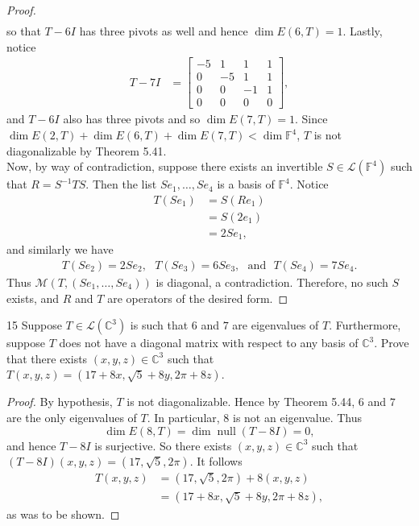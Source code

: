 \documentclass{extarticle}
\newenvironment{problem}[1]{\begin{prob*}{#1}{}}{\end{prob*}}
\newcommand{\C}{\mathbb{C}}
\newcommand{\F}{\mathbb{F}}
\newcommand{\mat}{\mathcal{M}}
\newcommand{\Hom}{\mathcal{L}}
\DeclareMathOperator{\Null}{null}
\begin{document}
\begin{proof}
\begin{align*}
\end{align*}
so that $T-6I$ has three pivots as well and hence $\dim E(6, T) = 1$.  Lastly, notice
\begin{align*}
T - 7I &= \begin{bmatrix}-5 & 1 & 1 & 1\\ 0 & -5 & 1 & 1\\ 0 & 0 & -1 & 1\\0 & 0 & 0 & 0  \end{bmatrix}, 
\end{align*}
and $T-6I$ also has three pivots and so $\dim E(7, T) = 1$.  Since $\dim E(2, T) + \dim E(6, T) + \dim E(7, T) < \dim \F^4$, $T$ is not diagonalizable by Theorem 5.41.\\
\indent Now, by way of contradiction, suppose there exists an invertible $S\in\Hom(\F^4)$ such that $R=S^{-1}TS$.  Then the list $Se_1, \dots, Se_4$ is a basis of $\F^4$.  Notice
\begin{align*}
T(Se_1) &= S(Re_1)\\
&= S(2e_1)\\
&= 2Se_1,
\end{align*}
and similarly we have
\begin{align*}
T(Se_2) = 2Se_2, ~~~ T(Se_3) = 6Se_3, ~~~ \text{and} ~~~ T(Se_4) = 7Se_4.
\end{align*}
Thus $\mat\left(T, (Se_1, \dots, Se_4)\right)$ is diagonal, a contradiction.  Therefore, no such $S$ exists, and $R$ and $T$ are operators of the desired form.
\end{proof}

\begin{problem}{15}
Suppose $T\in\Hom(\C^3)$ is such that $6$ and $7$ are eigenvalues of $T$.  Furthermore, suppose $T$ does not have a diagonal matrix with respect to any basis of $\C^3$.  Prove that there exists $(x, y, z)\in\C^3$ such that $T(x, y, z) = (17 + 8x, \sqrt{5} + 8y, 2\pi + 8z)$.  
\end{problem}
\begin{proof}
By hypothesis, $T$ is not diagonalizable.  Hence by Theorem 5.44, $6$ and $7$ are the only eigenvalues of $T$.  In particular, $8$ is not an eigenvalue.  Thus
\begin{equation*}
\dim E(8, T) = \dim \Null(T - 8I) = 0,
\end{equation*}
and hence $T - 8I$ is surjective.  So there exists $(x, y, z) \in \C^3$ such that $(T - 8I)(x, y, z) = (17, \sqrt{5}, 2\pi)$.  It follows
\begin{align*}
T(x, y, z) &= (17, \sqrt{5}, 2\pi) + 8(x, y, z)\\
&=  (17 + 8x, \sqrt{5} + 8y, 2\pi + 8z),
\end{align*}
as was to be shown.
\end{proof}
\end{document}
